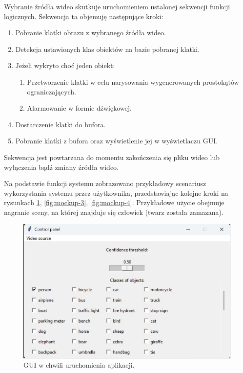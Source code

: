 Wybranie źródła wideo skutkuje uruchomieniem ustalonej sekwencji funkcji logicznych. Sekwencja ta objemuję następujące kroki:
\begin{enumerate}
    \item Pobranie klatki obrazu z wybranego źródła wideo.
    \item Detekcja ustawionych klas obiektów na bazie pobranej klatki.
    \item Jeżeli wykryto choć jeden obiekt:
    \begin{enumerate}
        \item Przetworzenie klatki w celu narysowania wygenerowanych prostokątów ograniczających. 
        \item Alarmowanie w formie dźwiękowej. 
    \end{enumerate}
    \item Dostarczenie klatki do bufora.
    \item Pobranie klatki z bufora oraz wyświetlenie jej w wyświetlaczu GUI.
\end{enumerate} 
Sekwencja jest powtarzana do momentu zakończenia się pliku wideo lub wyłączenia bądź zmiany źródła wideo. 

Na podstawie funkcji systemu zobrazowano przykładowy scenariusz wykorzystania systemu przez użytkownika, przedstawiając kolejne kroki na rysunkach \ref{fig:mockup-2}, \ref{fig:mockup-3}, \ref{fig:mockup-4}. Przykładowe użycie obejmuje nagranie sceny, na której znajduje się człowiek (twarz została zamazana).

\begin{figure}[H]
    \centering
    \includegraphics[width=\linewidth]{r_implementacja/panel_sterowania/panel_mockup.jpg}
    \caption{GUI w chwili uruchomienia aplikacji.}
    \label{fig:mockup-2}
\end{figure}


